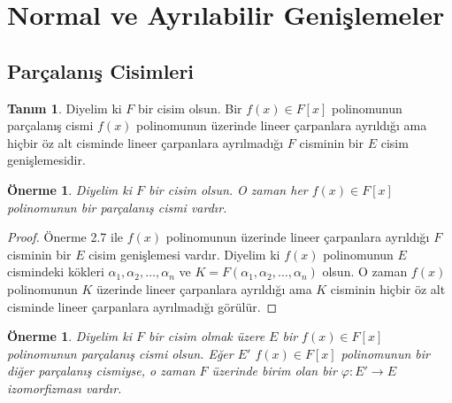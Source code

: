 \documentclass[draft]{article}
\newtheorem{prop}[thm]{Önerme}
\theoremstyle{definition}
\newtheorem{defn}{Tanım}[section]
\theoremstyle{remark}
\begin{document}
	\section{Normal ve Ayrılabilir Genişlemeler}
	
    	\subsection{Parçalanış Cisimleri}
    	
        	\begin{defn}
    	        Diyelim ki $F$ bir cisim olsun. Bir $f(x) \in F[x]$ polinomunun parçalanış cismi $f(x)$ polinomunun üzerinde lineer çarpanlara ayrıldığı ama hiçbir öz alt cisminde lineer çarpanlara ayrılmadığı $F$ cisminin bir $E$ cisim genişlemesidir.
    	    \end{defn}
    	    
    	    \begin{prop}
    	        Diyelim ki $F$ bir cisim olsun. O zaman her $f(x) \in F[x]$ polinomunun bir parçalanış cismi vardır.
    	    \end{prop}
    	    
    	    \begin{proof}
    	        Önerme 2.7 ile $f(x)$ polinomunun üzerinde lineer çarpanlara ayrıldığı $F$ cisminin bir $E$ cisim genişlemesi vardır. Diyelim ki $f(x)$ polinomunun $E$ cismindeki kökleri $\alpha_1, \alpha_2, \dots, \alpha_n$ ve $K = F(\alpha_1, \alpha_2, \dots, \alpha_n)$ olsun. O zaman $f(x)$ polinomunun $K$ üzerinde lineer çarpanlara ayrıldığı ama $K$ cisminin hiçbir öz alt cisminde lineer çarpanlara ayrılmadığı görülür.
    	    \end{proof}
    	    
    	    \begin{prop}
    	        Diyelim ki $F$ bir cisim olmak üzere $E$ bir $f(x) \in F[x]$ polinomunun parçalanış cismi olsun. Eğer $E'$ $f(x) \in F[x]$ polinomunun bir diğer parçalanış cismiyse, o zaman $F$ üzerinde birim olan bir $\varphi: E' \to E$ izomorfizması vardır.
    		\end{prop}
    		
\end{document}
